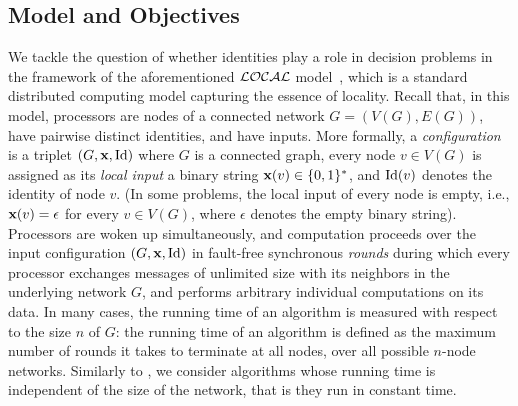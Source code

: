 \documentclass{llncs}
\newcommand{\local}{{\cal LOCAL}}
\newcommand{\inp}{\mbox{\rm\bf x}}
\newcommand{\id}{\mbox{\rm Id}}
\begin{document}
\subsection{Model and Objectives}

We tackle the question of whether identities play a role in decision problems in the framework of the aforementioned $\local$ model~\cite{PelB00}, which is a standard distributed computing model capturing the essence of locality. Recall that, in this model, processors are nodes of a connected network $G=(V(G),E(G))$, have pairwise distinct identities, and have inputs. More formally, a {\em configuration} is a triplet $(G,\inp,\id)$ where $G$ is a connected graph, every node $v\in V(G)$ is assigned as its {\em local input} a binary string $\inp(v)\in \{0,1\}^*$, and $\id(v)$ denotes the identity of node $v$. (In some problems, the local input of every node is empty, i.e., $\inp(v)=\epsilon$ for every $v\in V(G)$, where $\epsilon$ denotes the empty binary string). Processors are woken up simultaneously, and computation proceeds over the input configuration $(G,\inp,\id)$ in fault-free synchronous \emph{rounds} during which every processor exchanges messages of unlimited size with its neighbors in the underlying network $G$, and performs arbitrary individual computations on its data. In many cases, the running time of an algorithm is measured with respect to the size $n$ of $G$: the running time of an algorithm is defined as the maximum number of rounds it takes to terminate at all nodes, over all possible $n$-node networks. Similarly to \cite{HHRS12,NS93}, we consider algorithms whose running time is independent of the size of the network, that is they run in constant time. 
\end{document}
